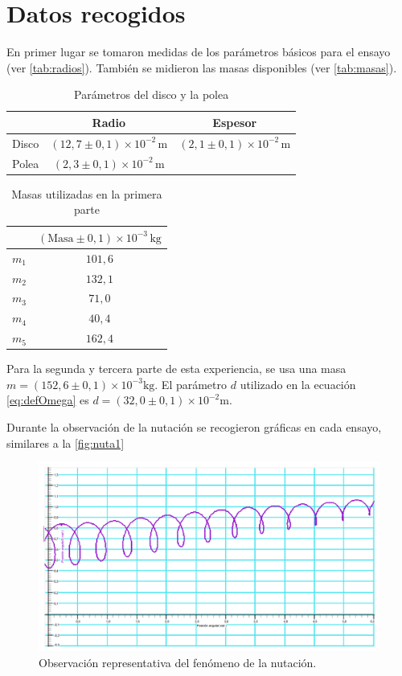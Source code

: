 \documentclass[a4paper]{article}
\begin{document}
\section{Datos recogidos}
En primer lugar se tomaron medidas de los parámetros básicos para el ensayo (ver \autoref{tab:radios}). También se midieron las masas disponibles (ver \autoref{tab:masas}).
\begin{table}[h]
\begin{center}
\begin{tabular}{|c|c|c|}
\cline{2-3}
\multicolumn{1}{c|}{}& Radio & Espesor\\
\hline
Disco&$\left(12,7\pm 0,1\right)\times 10^{-2}\,\text{m}$&$\left(2,1\pm 0,1\right)\times 10^{-2}\,\text{m}$\\
\hline
Polea&$\left(2,3\pm 0,1\right)\times 10^{-2}\,\text{m}$&\multicolumn{1}{c}{}\\
\cline{1-2}
\end{tabular}
\caption{Parámetros del disco y la polea}
\label{tab:radios}
\end{center}
\end{table}
\begin{table}[h]
\begin{center}
\begin{tabular}{|c|c|}
\cline{2-2}
\multicolumn{1}{c|}{}&$\left( \text{Masa}\pm 0,1\right) \times 10^{-3}\,\text{kg}$\\ \hline
$m_1$&$101,6$\\ \hline
$m_2$&$132,1$\\ \hline
$m_3$&$71,0$\\ \hline
$m_4$&$40,4$\\ \hline
$m_5$&$162,4$\\ \hline
\end{tabular}
\caption{Masas utilizadas en la primera parte}
\label{tab:masas}
\end{center}
\end{table}
Para la segunda y tercera parte de esta experiencia, se usa una masa $m=\left(152,6\pm 0,1\right)\times 10^{-3} \text{kg}$. El parámetro $d$ utilizado en la ecuación \eqref{eq:defOmega} es $d=\left(32,0\pm 0,1\right)\times 10^{-2} \text{m}$. 

Durante la observación de la nutación se recogieron gráficas en cada ensayo, similares a la \autoref{fig:nuta1}
\begin{figure}[h]
\begin{center}
\includegraphics[width=12 cm]{nuta1.png}
\caption{Observación representativa del fenómeno de la nutación.}
\label{fig:nuta1}
\end{center}
\end{figure}
\end{document}

